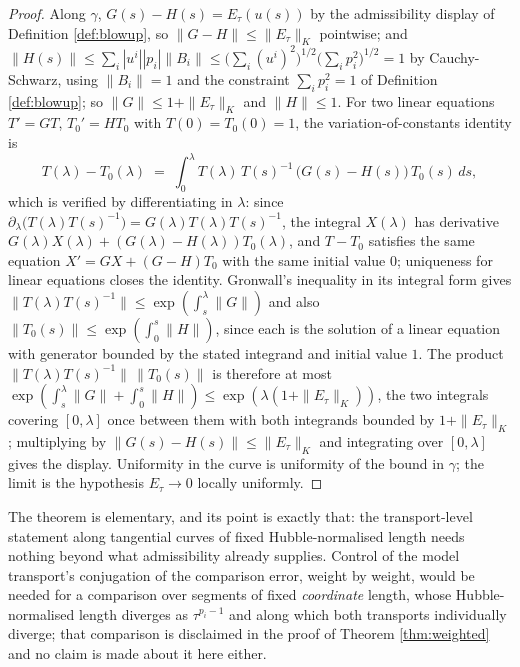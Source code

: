 \documentclass[11pt]{article}
\theoremstyle{definition}
\begin{document}
\begin{proof}
Along $\gamma$, $G(s) - H(s) = E_{\tau}(u(s))$ by the admissibility display of Definition \ref{def:blowup}, so $\|G - H\| \le \|E_{\tau}\|_{K}$ pointwise; and $\|H(s)\| \le \sum_{i} |u^{i}| |p_{i}| \|B_{i}\| \le \bigl(\sum_i (u^{i})^{2}\bigr)^{1/2} \bigl(\sum_i p_{i}^{2}\bigr)^{1/2} = 1$ by Cauchy-Schwarz, using $\|B_i\| = 1$ and the constraint $\sum_i p_{i}^{2} = 1$ of Definition \ref{def:blowup}; so $\|G\| \le 1 + \|E_{\tau}\|_{K}$ and $\|H\| \le 1$. For two linear equations $T' = GT$, $T_{0}' = HT_{0}$ with $T(0) = T_{0}(0) = 1$, the variation-of-constants identity is
\[
T(\lambda) - T_{0}(\lambda) \;=\; \int_{0}^{\lambda} T(\lambda)\,T(s)^{-1}\,\bigl(G(s) - H(s)\bigr)\,T_{0}(s)\,ds ,
\]
which is verified by differentiating in $\lambda$: since $\partial_{\lambda}\bigl(T(\lambda)T(s)^{-1}\bigr) = G(\lambda)T(\lambda)T(s)^{-1}$, the integral $X(\lambda)$ has derivative $G(\lambda)X(\lambda) + (G(\lambda) - H(\lambda))T_{0}(\lambda)$, and $T - T_{0}$ satisfies the same equation $X' = GX + (G - H)T_{0}$ with the same initial value $0$; uniqueness for linear equations closes the identity. Gronwall's inequality in its integral form gives $\|T(\lambda)T(s)^{-1}\| \le \exp(\int_{s}^{\lambda}\|G\|)$ and also $\|T_{0}(s)\| \le \exp(\int_{0}^{s}\|H\|)$, since each is the solution of a linear equation with generator bounded by the stated integrand and initial value $1$. The product $\|T(\lambda)T(s)^{-1}\|\,\|T_{0}(s)\|$ is therefore at most $\exp(\int_{s}^{\lambda}\|G\| + \int_{0}^{s}\|H\|) \le \exp(\lambda(1 + \|E_{\tau}\|_{K}))$, the two integrals covering $[0, \lambda]$ once between them with both integrands bounded by $1 + \|E_{\tau}\|_{K}$; multiplying by $\|G(s) - H(s)\| \le \|E_{\tau}\|_{K}$ and integrating over $[0, \lambda]$ gives the display. Uniformity in the curve is uniformity of the bound in $\gamma$; the limit is the hypothesis $E_{\tau} \to 0$ locally uniformly.
\end{proof}

The theorem is elementary, and its point is exactly that: the transport-level statement along tangential curves of fixed Hubble-normalised length needs nothing beyond what admissibility already supplies. Control of the model transport's conjugation of the comparison error, weight by weight, would be needed for a comparison over segments of fixed \emph{coordinate} length, whose Hubble-normalised length diverges as $\tau^{p_{i} - 1}$ and along which both transports individually diverge; that comparison is disclaimed in the proof of Theorem \ref{thm:weighted} and no claim is made about it here either.
\end{document}
